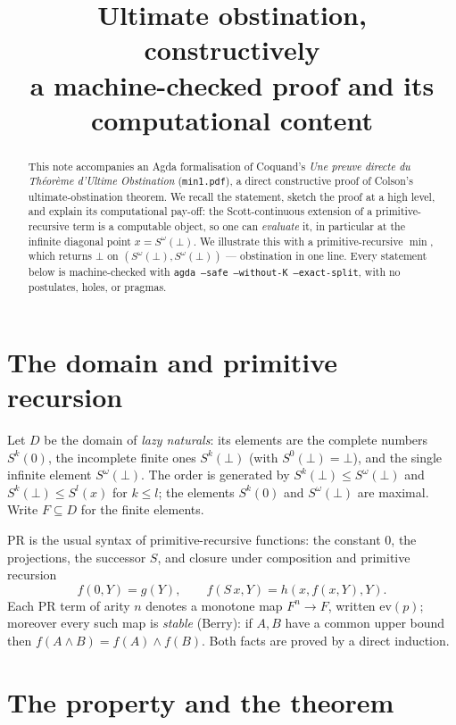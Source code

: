 \documentclass[11pt]{article}
\title{Ultimate obstination, constructively\\
{\large a machine-checked proof and its computational content}}
\author{}
\date{}
\newcommand{\PR}{\mathrm{PR}}
\newcommand{\evalF}{\mathrm{ev}}
\newcommand{\Sw}{S^{\omega}(\bot)}
\newcommand{\D}{D}
\newcommand{\F}{F}
\begin{document}
\maketitle

\begin{abstract}
This note accompanies an Agda formalisation of Coquand's \emph{Une preuve
directe du Th\'eor\`eme d'Ultime Obstination} (\texttt{min1.pdf}), a direct
constructive proof of Colson's ultimate-obstination theorem. We recall the
statement, sketch the proof at a high level, and explain its computational
pay-off: the Scott-continuous extension of a primitive-recursive term is a
computable object, so one can \emph{evaluate} it, in particular at the
infinite diagonal point $x=\Sw$. We illustrate this with a primitive-recursive
$\min$, which returns $\bot$ on $(\Sw,\Sw)$ --- obstination in one line.
Every statement below is machine-checked with
\texttt{agda --safe --without-K --exact-split}, with no postulates, holes, or
pragmas.
\end{abstract}

\section{The domain and primitive recursion}

Let $\D$ be the domain of \emph{lazy naturals}: its elements are the complete
numbers $S^k(0)$, the incomplete finite ones $S^k(\bot)$ (with $S^0(\bot)=\bot$),
and the single infinite element $\Sw$. The order is generated by
$S^k(\bot)\le S^\omega(\bot)$ and $S^k(\bot)\le S^l(x)$ for $k\le l$; the
elements $S^k(0)$ and $\Sw$ are maximal. Write $\F\subseteq\D$ for the finite
elements.

$\PR$ is the usual syntax of primitive-recursive functions: the constant $0$,
the projections, the successor $S$, and closure under composition and
primitive recursion
\[
  f(0,Y)=g(Y),\qquad f(S\,x,Y)=h(x,f(x,Y),Y).
\]
Each $\PR$ term of arity $n$ denotes a monotone map $\F^n\to\F$, written
$\evalF(p)$; moreover every such map is \emph{stable} (Berry): if $A,B$ have a
common upper bound then $f(A\wedge B)=f(A)\wedge f(B)$. Both facts are proved by
a direct induction.

\section{The property and the theorem}
\end{document}
